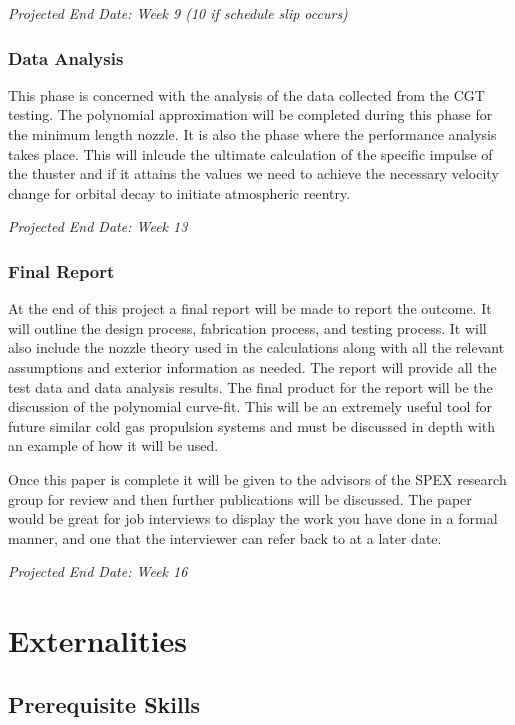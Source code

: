 \documentclass[conference]{IEEEtran} %
\begin{document}
    \textit{Projected End Date: Week 9 (10 if schedule slip occurs)}

\subsubsection{Data Analysis}
\label{subsubsec: data analysis}
    This phase is concerned with the analysis of the data collected from the CGT testing. The polynomial approximation will be completed during this
    phase for the minimum length nozzle. It is also the phase where the performance analysis takes place. This will inlcude the ultimate calculation of the specific impulse
    of the thuster and if it attains the values we need to achieve the necessary velocity change for orbital decay to initiate atmospheric reentry.

    \textit{Projected End Date: Week 13}

\subsubsection{Final Report}
\label{subsubsec: final report}
    At the end of this project a final report will be made to report the outcome. It will outline the design process, fabrication process, and testing process.
    It will also include the nozzle theory used in the calculations along with all the relevant assumptions and exterior information as needed. The report will provide
    all the test data and data analysis results. The final product for the report will be the discussion of the polynomial curve-fit. This will be an extremely useful tool
    for future similar cold gas propulsion systems and must be discussed in depth with an example of how it will be used.

    Once this paper is complete it will be given to the advisors of the SPEX research group for review and then further publications will be discussed. The paper would
    be great for job interviews to display the work you have done in a formal manner, and one that the interviewer can refer back to at a later date.

    \textit{Projected End Date: Week 16}

\section{Externalities}
\subsection{Prerequisite Skills}
\end{document}
